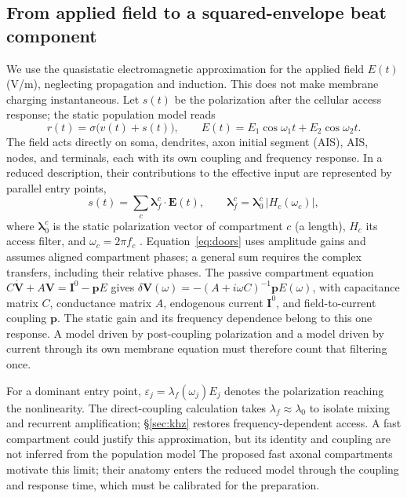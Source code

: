 \documentclass[11pt,a4paper]{article}
\newcommand{\Sig}{\sigma}
\providecommand{\DIFaddtex}[1]{{\protect\color{blue} \sf #1}} %
\providecommand{\DIFdeltex}[1]{{\protect\color{red} \scriptsize #1}} %
\providecommand{\DIFaddbegin}{} %
\providecommand{\DIFaddend}{} %
\providecommand{\DIFdelbegin}{} %
\providecommand{\DIFdelend}{} %
\providecommand{\DIFadd}[1]{\texorpdfstring{\DIFaddtex{#1}}{#1}} %
\providecommand{\DIFdel}[1]{\texorpdfstring{\DIFdeltex{#1}}{}} %
\begin{document}
\subsection{From applied field to a squared-envelope beat component}\label{sec:coupling}
We use the quasistatic electromagnetic approximation for the applied field $E(t)$
(V/m), neglecting propagation and induction. This does not make membrane charging
instantaneous. Let $s(t)$ be the polarization after the cellular access response;
the static population model reads
\begin{equation}
r(t)=\Sig\!\big(v(t)+s(t)\big),\qquad
E(t)=E_1\cos\omega_1 t+E_2\cos\omega_2 t .
\label{eq:coupling}
\end{equation}
The field acts directly on soma, dendrites, \DIFdelbegin \DIFdel{axon initial segment (AIS), }\DIFdelend \DIFaddbegin \DIFadd{AIS, nodes, }\DIFaddend and terminals,
each with its own coupling and frequency response. In a reduced description, their
contributions to the effective input are represented by parallel entry points,
\begin{equation}
s(t)=\sum_c \boldsymbol\lambda^c_f\!\cdot\!\mathbf E(t),\qquad
\boldsymbol\lambda^c_f=\boldsymbol\lambda^c_0\,\lvert H_c(\omega_c)\rvert,
\label{eq:doors}
\end{equation}
where $\boldsymbol\lambda^c_0$ is the static polarization vector of compartment $c$ (a length),
$H_c$ its access filter, and $\omega_c=2\pi f_c$
\cite{ruffini2025rosetta,galangadea2023}. Equation~\eqref{eq:doors} uses amplitude
gains and assumes aligned compartment phases; a general sum requires the complex
transfers, including their relative phases. The passive
compartment equation $C\dot{\mathbf V}+A\mathbf V=\mathbf I^0-\mathbf pE$
\cite{ruffini2021nmm2} gives
$\delta\mathbf V(\omega)=-(A+i\omega C)^{-1}\mathbf pE(\omega)$, with capacitance
matrix $C$, conductance matrix $A$, endogenous current $\mathbf I^0$, and field-to-current
coupling $\mathbf p$. The static gain and its frequency dependence belong to this
one response. A model driven by post-coupling polarization and a model driven by
current through its own membrane equation must therefore count that filtering once.

For a dominant entry point, $\varepsilon_j=\lambda_f(\omega_j)E_j$ denotes the
polarization reaching the nonlinearity. The direct-coupling calculation takes
$\lambda_f\approx\lambda_0$ to isolate mixing and recurrent amplification;
\S\ref{sec:khz} restores frequency-dependent access. \DIFdelbegin \DIFdel{A fast compartment could
justify this approximation, but its identity and coupling are not inferred from
the population model }\DIFdelend \DIFaddbegin \DIFadd{The proposed fast axonal
compartments motivate this limit; their anatomy enters the reduced model through
the coupling and response time, which must be calibrated for the preparation}\DIFaddend .
\end{document}
